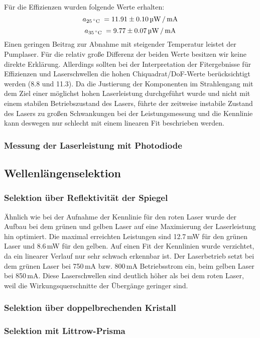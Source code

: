 Für die Effizienzen wurden folgende Werte erhalten:
\begin{equation*}
a_{25\text{\grad}} = 11.91\pm0.10\,\text{\textmu W\,/\,mA}
\end{equation*}
\begin{equation*}
a_{35\text{\grad}} = 9.77\pm0.07\,\text{\textmu W\,/\,mA}
\end{equation*}
Einen geringen Beitrag zur Abnahme mit steigender Temperatur leistet der Pumplaser.
Für die relativ große Differenz der beiden Werte besitzen wir keine direkte Erklärung.
Allerdings sollten bei der Interpretation der Fitergebnisse für Effizienzen und
Laserschwellen die hohen Chiquadrat/DoF-Werte berücksichtigt werden (8.8 und 11.3).
Da die Justierung der Komponenten im Strahlengang mit dem Ziel einer möglichst hohen Laserleistung
durchgeführt wurde und nicht mit einem stabilen Betriebszustand des Lasers,
führte der zeitweise instabile Zustand des Lasers zu großen Schwankungen bei der Leistungsmessung
und die Kennlinie kann deswegen nur schlecht mit einem linearen Fit beschrieben werden.


\subsubsection{Messung der Laserleistung mit Photodiode}


\subsection{Wellenlängenselektion}

\subsubsection{Selektion über Reflektivität der Spiegel}

Ähnlich wie bei der Aufnahme der Kennlinie für den roten Laser wurde der Aufbau bei dem grünen und
gelben Laser auf eine Maximierung der Laserleistung hin optimiert.
Die maximal erreichten Leistungen sind 12.7\,mW für den grünen Laser und 8.6\,mW für den gelben.
Auf einen Fit der Kennlinien wurde verzichtet,
da ein linearer Verlauf nur sehr schwach erkennbar ist.
Der Laserbetrieb setzt bei dem grünen Laser bei 750\,mA bzw. 800\,mA Betriebsstrom ein,
beim gelben Laser bei 850\,mA.
Diese Laserschwellen sind deutlich höher als bei dem roten Laser,
weil die Wirkungsquerschnitte der Übergänge geringer sind.

\subsubsection{Selektion über doppelbrechenden Kristall}

\subsubsection{Selektion mit Littrow-Prisma}
